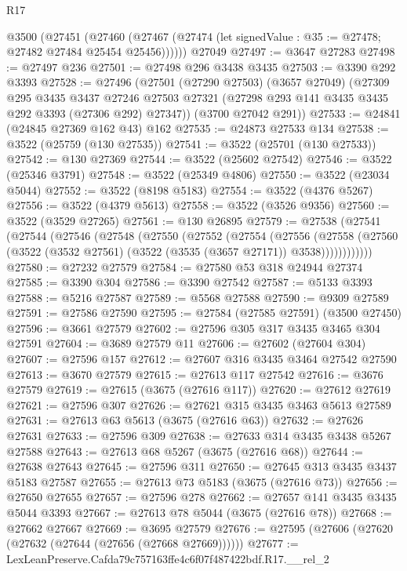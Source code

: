 \begin{lexlean}{R17}
\begin{coremodule}
    @3500
      (@27451
        (@27460 (@27467 (@27474 (let signedValue : @35 := @27478; @27482 @27484 @25454 @25456))))))
    @27049
@27497 := @3647 @27283
@27498 := @27497 @236
@27501 := @27498 @296 @3438 @3435
@27503 := @3390 @292 @3393
@27528 := @27496
    (@27501
      (@27290 @27503)
      (@3657 @27049)
      (@27309
        @295
        @3435
        @3437
        @27246
        @27503
        @27321
        (@27298 @293 @141 @3435 @3435 @292 @3393 (@27306 @292) @27347))
      (@3700 @27042 @291))
@27533 := @24841 (@24845 @27369 @162 @43) @162
@27535 := @24873 @27533 @134
@27538 := @3522 (@25759 (@130 @27535))
@27541 := @3522 (@25701 (@130 @27533))
@27542 := @130 @27369
@27544 := @3522 (@25602 @27542)
@27546 := @3522 (@25346 @3791)
@27548 := @3522 (@25349 @4806)
@27550 := @3522 (@23034 @5044)
@27552 := @3522 (@8198 @5183)
@27554 := @3522 (@4376 @5267)
@27556 := @3522 (@4379 @5613)
@27558 := @3522 (@3526 @9356)
@27560 := @3522 (@3529 @27265)
@27561 := @130 @26895
@27579 := @27538
    (@27541
      (@27544
        (@27546
          (@27548
            (@27550
              (@27552
                (@27554
                  (@27556
                    (@27558
                      (@27560 (@3522 (@3532 @27561) (@3522 (@3535 (@3657 @27171)) @3538))))))))))))
@27580 := @27232 @27579
@27584 := @27580 @53 @318 @24944 @27374
@27585 := @3390 @304
@27586 := @3390 @27542
@27587 := @5133 @3393
@27588 := @5216 @27587
@27589 := @5568 @27588
@27590 := @9309 @27589
@27591 := @27586 @27590
@27595 := @27584 (@27585 @27591) (@3500 @27450)
@27596 := @3661 @27579
@27602 := @27596 @305 @317 @3435 @3465 @304 @27591
@27604 := @3689 @27579 @11
@27606 := @27602 (@27604 @304)
@27607 := @27596 @157
@27612 := @27607 @316 @3435 @3464 @27542 @27590
@27613 := @3670 @27579
@27615 := @27613 @117 @27542
@27616 := @3676 @27579
@27619 := @27615 (@3675 (@27616 @117))
@27620 := @27612 @27619
@27621 := @27596 @307
@27626 := @27621 @315 @3435 @3463 @5613 @27589
@27631 := @27613 @63 @5613 (@3675 (@27616 @63))
@27632 := @27626 @27631
@27633 := @27596 @309
@27638 := @27633 @314 @3435 @3438 @5267 @27588
@27643 := @27613 @68 @5267 (@3675 (@27616 @68))
@27644 := @27638 @27643
@27645 := @27596 @311
@27650 := @27645 @313 @3435 @3437 @5183 @27587
@27655 := @27613 @73 @5183 (@3675 (@27616 @73))
@27656 := @27650 @27655
@27657 := @27596 @278
@27662 := @27657 @141 @3435 @3435 @5044 @3393
@27667 := @27613 @78 @5044 (@3675 (@27616 @78))
@27668 := @27662 @27667
@27669 := @3695 @27579
@27676 := @27595 (@27606 (@27620 (@27632 (@27644 (@27656 (@27668 @27669))))))
@27677 := LexLeanPreserve.Cafda79c757163ffe4c6f07f487422bdf.R17.__rel_2

\end{coremodule}
\end{lexlean}
